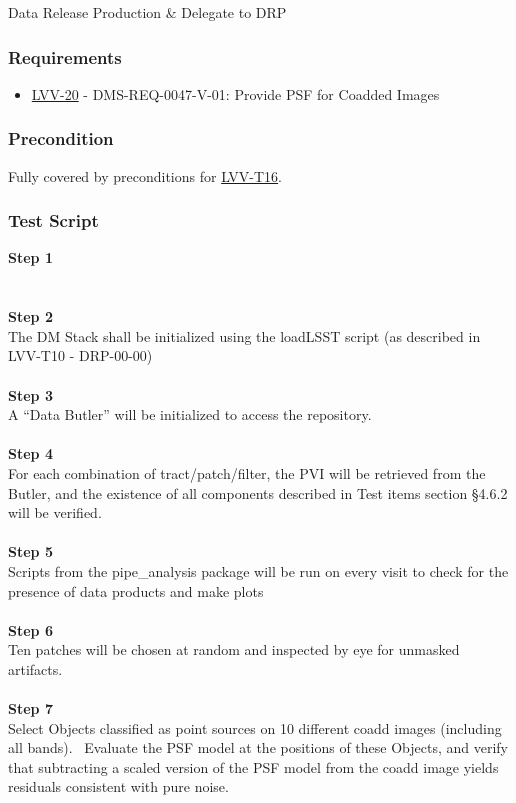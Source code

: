 Data Release Production \& Delegate to DRP

\hypertarget{requirements-39}{%
\subsubsection{Requirements}\label{requirements-39}}

\begin{itemize}
\tightlist
\item
  \href{https://jira.lsstcorp.org/browse/LVV-20}{LVV-20} -
  DMS-REQ-0047-V-01: Provide PSF for Coadded Images
\end{itemize}

\hypertarget{precondition-2}{%
\subsubsection{Precondition}\label{precondition-2}}

Fully covered by preconditions for
\href{https://jira.lsstcorp.org/secure/Tests.jspa\#/testCase/LVV-T16}{LVV-T16}.

\hypertarget{test-script-39}{%
\subsubsection{Test Script}\label{test-script-39}}

\textbf{Step 1}\\
~\\
~\\
\textbf{Step 2}\\
The DM Stack shall be initialized using the loadLSST script (as
described in LVV-T10 - DRP-00-00)\\
~\\
\textbf{Step 3}\\
A ``Data Butler'' will be initialized to access the repository.\\
~\\
\textbf{Step 4}\\
For each combination of tract/patch/filter, the PVI will be retrieved
from the Butler, and the existence of all components described in Test
items section §4.6.2 will be verified.\\
~\\
\textbf{Step 5}\\
Scripts from the pipe\_analysis package will be run on every visit to
check for the presence of data products and make plots\\
~\\
\textbf{Step 6}\\
Ten patches will be chosen at random and inspected by eye for unmasked
artifacts.\\
~\\
\textbf{Step 7}\\
Select Objects classified as point sources on 10 different coadd images
(including all bands). ~Evaluate the PSF model at the positions of these
Objects, and verify that subtracting a scaled version of the PSF model
from the coadd image yields residuals consistent with pure noise.\\
~\\

